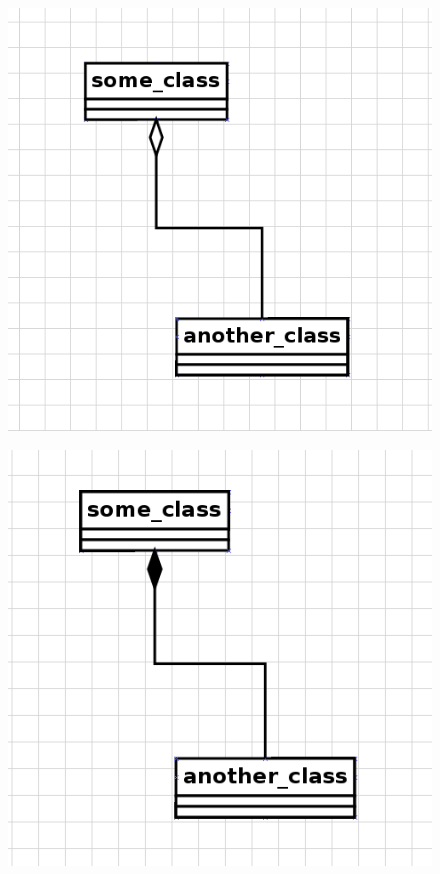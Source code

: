 \documentclass{book}
\begin{document}
\begin{figure}[H]
    \centering
    \includegraphics[scale=0.4]{images/association_aggregation.png}
    \caption{}
\end{figure}

\begin{figure}[H]
    \centering
    \includegraphics[scale=0.4]{images/association_composition.png}
    \caption{}
\end{figure}
\end{document}
